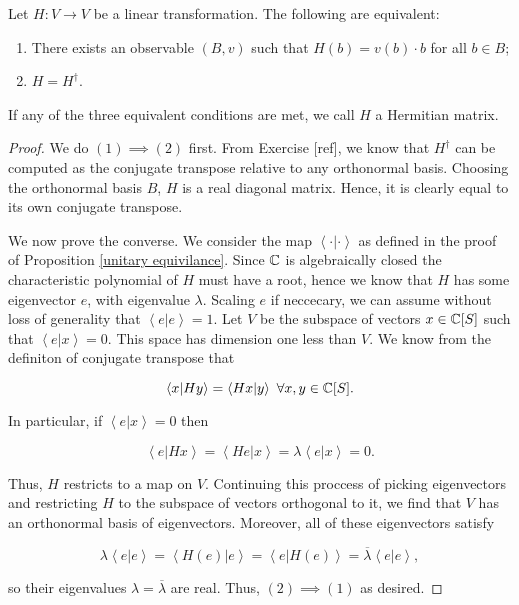 \begin{proposition}\label{Spectral theorem} Let $H: V\to V$ be a linear transformation. The following are equivalent:

\begin{enumerate}
\item There exists an observable $(B,v)$ such that $H(b)=v(b)\cdot b$ for all $b\in B$;
\item $H=H^{\dagger}$.
\end{enumerate}

If any of the three equivalent conditions are met, we call $H$ a Hermitian matrix.
\end{proposition}
\begin{proof} We do $(1)\implies (2)$ first. From Exercise [ref], we know that $H^{\dagger}$ can be computed as the conjugate transpose relative to any orthonormal basis. Choosing the orthonormal basis $B$, $H$ is a real diagonal matrix. Hence, it is clearly equal to its own conjugate transpose.

We now prove the converse. We consider the map $\left<\cdot |\cdot \right>$ as defined in the proof of Proposition \ref{unitary equivilance}. Since $\mathbb{C}$ is algebraically closed the characteristic polynomial of $H$ must have a root, hence we know that $H$ has some eigenvector $e$, with eigenvalue $\lambda$. Scaling $e$ if neccecary, we can assume without loss of generality that $\left<e | e\right> = 1$. Let $V$ be the subspace of vectors $x\in \mathbb{C}[S]$ such that $\left<e | x\right>=0$. This space has dimension one less than $V$. We know from the definiton of conjugate transpose that

$$\left<x | Hy\right>=\left<Hx |y\right>\,\, \forall x,y\in \mathbb{C}[S].$$

In particular, if $\left<e | x\right>=0$ then

$$\left< e | Hx \right>=\left<He | x \right>=\lambda \left< e| x \right>=0.$$

Thus, $H$ restricts to a map on $V$. Continuing this proccess of picking eigenvectors and restricting $H$ to the subspace of vectors orthogonal to it, we find that $V$ has an orthonormal basis of eigenvectors. Moreover, all of these eigenvectors satisfy

$$\lambda \left<e | e\right>=\left<H(e) | e\right>=\left<e | H(e)\right>=\overline{\lambda}\left<e | e\right>,$$

so their eigenvalues $\lambda=\overline{\lambda}$ are real. Thus, $(2)\implies (1)$ as desired.
\end{proof}

